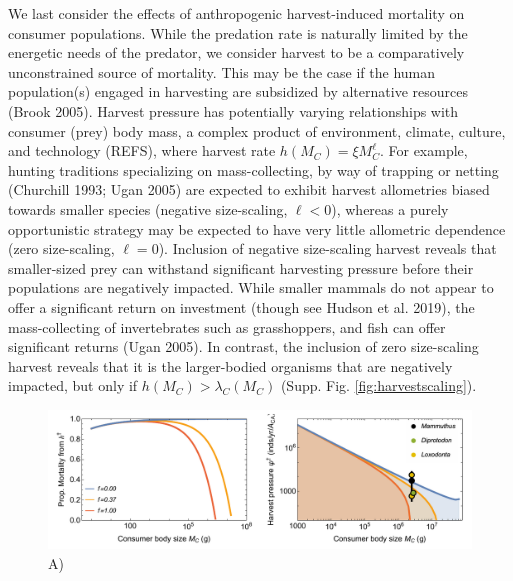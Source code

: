\documentclass[11pt]{article}
\begin{document}
We last consider the effects of anthropogenic harvest-induced mortality on consumer populations.
While the predation rate is naturally limited by the energetic needs of the predator, we consider harvest to be a comparatively unconstrained source of mortality.
This may be the case if the human population(s) engaged in harvesting are subsidized by alternative resources (Brook 2005).
Harvest pressure has potentially varying relationships with consumer (prey) body mass, a complex product of environment, climate, culture, and technology (REFS), where harvest rate $h(M_C) = \xi M_C^\ell$.
For example, hunting traditions specializing on mass-collecting, by way of trapping or netting (Churchill 1993; Ugan 2005) are expected to exhibit harvest allometries biased towards smaller species (negative size-scaling, $\ell<0$), whereas a purely opportunistic strategy may be expected to have very little allometric dependence (zero size-scaling, $\ell=0$).
Inclusion of negative size-scaling harvest reveals that smaller-sized prey can withstand significant harvesting pressure before their populations are negatively impacted.
While smaller mammals do not appear to offer a significant return on investment (though see Hudson et al. 2019), the mass-collecting of invertebrates such as grasshoppers, and fish can offer significant returns (Ugan 2005).
In contrast, the inclusion of zero size-scaling harvest reveals that it is the larger-bodied organisms that are negatively impacted, but only if $h(M_C) > \lambda_C(M_C)$ (Supp. Fig. \ref{fig:harvestscaling}).



\begin{figure}[h!]
    \centering
    \includegraphics[width=1\textwidth]{fig_harvest.pdf}
    \caption{
    \footnotesize
    A)  
    }
    \label{fig:harvest}
\end{figure}
\end{document}
